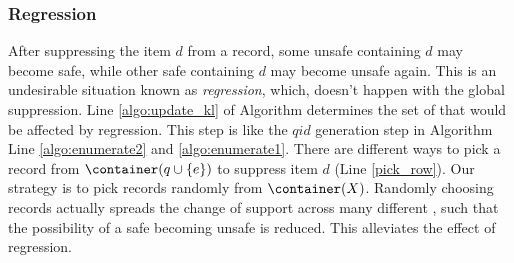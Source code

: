 \subsubsection{Regression}
After suppressing the item $d$ from a record, 
some unsafe \qids containing $d$ may become safe, while other safe \qids
containing $d$ may become unsafe again.
This is an undesirable situation known as {\em regression}, which, doesn't 
happen with the global suppression.
Line \ref{algo:update_kl} of
Algorithm \SanitizeBuffer determines the set of
\qids that would be affected by regression. This step is like the $qid$
generation step in Algorithm \PartialSuppression~ Line \ref{algo:enumerate2}
and \ref{algo:enumerate1}. There are different ways to pick a
record from $\container(q\cup \{e\})$ to suppress item $d$ (Line
\ref{pick_row}). Our strategy is to pick records randomly from $\container(X)$.
Randomly choosing records actually spreads the change of support across 
many different \qids, such that the possibility of a safe \qid becoming unsafe is
reduced. This alleviates the effect of regression.
